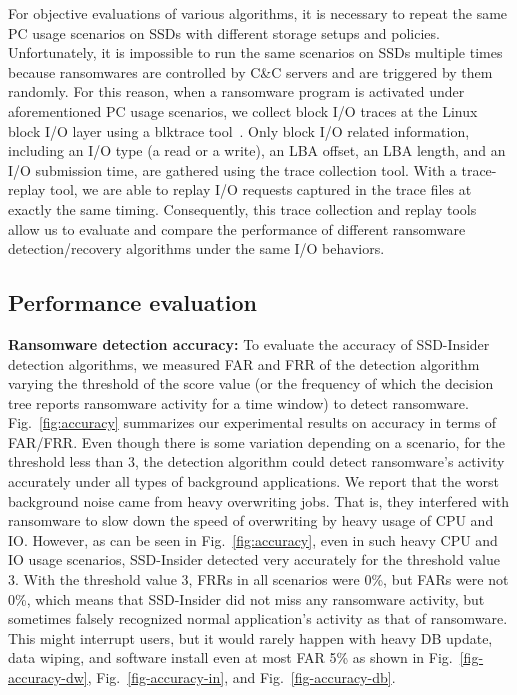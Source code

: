 \documentclass[conference]{IEEEtran}
\newcommand{\ours}{SSD-Insider}
\begin{document}
For objective evaluations of various algorithms, it is necessary to
repeat the same PC usage scenarios on SSDs with different storage
setups and policies.  Unfortunately, it is impossible to run the
same scenarios on SSDs multiple times because ransomwares are
controlled by C\&C servers and are triggered by them randomly. For
this reason, when a ransomware program is activated under
aforementioned PC usage scenarios, we collect block I/O traces at
the Linux block I/O layer using a blktrace tool~\cite{blktrace}.
Only block I/O related information, including an I/O type (a read
or a write), an LBA offset, an LBA length, and an I/O submission
time, are gathered using the trace collection tool.  With a
trace-replay tool, we are able to replay I/O requests captured in
the trace files at exactly the same timing.  Consequently, this
trace collection and replay tools allow us to evaluate and compare
the performance of different ransomware detection/recovery
algorithms under the same I/O behaviors. 


\subsection{Performance evaluation}\label{sec:peval}
{\bf Ransomware detection accuracy:}
{\color{blue}
To evaluate the accuracy of SSD-Insider detection algorithms, we
measured FAR and FRR of the detection algorithm varying the
threshold of the score value (or the frequency of which the
decision tree reports ransomware activity for a time window) to
detect ransomware.  Fig.~\ref{fig:accuracy} summarizes our
experimental results on accuracy in terms of FAR/FRR.  Even though
there is some variation depending on a scenario, for the threshold
less than 3, the detection algorithm could detect ransomware's
activity accurately under all types of background applications.  We
report that the worst background noise came from heavy overwriting jobs.  
That is, they interfered with ransomware to
slow down the speed of overwriting by heavy usage of CPU and IO.
However, as can be seen in Fig.~\ref{fig:accuracy}, even in such
heavy CPU and IO usage scenarios, \ours{} detected very accurately
for the threshold value 3.  With the threshold value 3, FRRs in all
scenarios were 0\%, but FARs were not 0\%, which means that \ours{}
did not miss any ransomware activity, but sometimes falsely
recognized normal application's activity as that of ransomware.
This might interrupt users, but it would rarely happen with heavy
DB update, data wiping, and software install even at most FAR 5\%
as shown in Fig.~\ref{fig-accuracy-dw}, Fig.~\ref{fig-accuracy-in},
and Fig.~\ref{fig-accuracy-db}.
}
\end{document}
